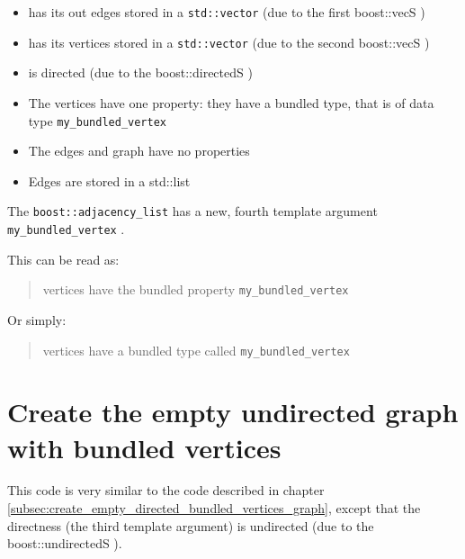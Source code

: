 \begin{itemize}
  \item has its out edges stored in a \verb;std::vector;  
    (due to the first boost::vecS )
  \item has its vertices stored in a \verb;std::vector; 
    (due to the second boost::vecS )
  \item is directed 
    (due to the boost::directedS )
  \item The vertices have one property: 
    they have a bundled type, 
    that is of data type \verb;my_bundled_vertex;
  \item The edges and graph have no properties
  \item Edges are stored in a std::list
\end{itemize}

The \verb;boost::adjacency_list; has a new, fourth template argument 
\verb;my_bundled_vertex; .

This can be read as: 

\begin{quote}
vertices have the bundled property \verb;my_bundled_vertex;
\end{quote}

Or simply: 

\begin{quote}
vertices have a bundled type called \verb;my_bundled_vertex;
\end{quote}

\section{Create the empty undirected graph with bundled vertices}
\label{subsec:create_empty_undirected_bundled_vertices_graph}



This code is very similar to the code described 
in chapter \ref{subsec:create_empty_directed_bundled_vertices_graph}, 
except that the directness (the third template argument) is undirected 
(due to the boost::undirectedS ).

